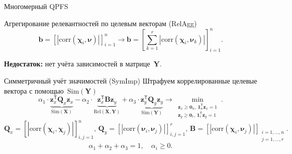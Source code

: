 \documentclass[9pt]{beamer}
\newcommand{\bz}{\mathbf{z}}
\newcommand{\bb}{\mathbf{b}}
\newcommand{\bY}{\mathbf{Y}}
\newcommand{\bX}{\mathbf{X}}
\newcommand{\bB}{\mathbf{B}}
\newcommand{\bQ}{\mathbf{Q}}
\newcommand{\bchi}{\boldsymbol{\chi}}
\newcommand{\bnu}{\boldsymbol{\nu}}
\newcommand{\bOne}{\boldsymbol{1}}
\newcommand{\bZero}{\boldsymbol{0}}
\newcommand{\T}{\mathsf{T}}
\begin{document}
\begin{frame}{Многомерный QPFS}
\begin{block}{Агрегирование релевантностей по целевым векторам (RelAgg)}
\[
\bb = \left[\left|\text{corr}(\bchi_i, \bnu)\right|\right]_{i=1}^n \rightarrow \bb = \left[\sum_{k=1}^r\left|\text{corr}(\bchi_i, \bnu_k)\right|\right]_{i=1}^n.
\]
\end{block}
{\bf Недостаток:} нет учёта зависимостей в матрице~$\bY$. 

\begin{block}{Симметричный учёт значимостей (SymImp)}
Штрафуем коррелированные целевые вектора с помощью~$\text{Sim} (\bY)$
\[
\alpha_1 \cdot \underbrace{\bz_x^{\T} \bQ_x \bz_x}_{\text{Sim}(\bX)} - \alpha_2 \cdot \underbrace{\bz_x^{\T} \bB \bz_y}_{\text{Rel}(\bX, \bY)} + \alpha_3 \cdot \underbrace{\bz_y^{\T} \bQ_y \bz_y}_{\text{Sim}(\bY)} \rightarrow \min_{\substack{\bz_x \geq \bZero_n, \, \bOne_n^{\T}\bz_x=1 \\ \bz_y \geq \bZero_r, \, \bOne_r^{\T}\bz_y=1}}.
\]
\[
\bQ_x = \left[ \left| \text{corr}(\bchi_i, \bchi_j) \right| \right]_{i,j=1}^n, \,
\bQ_y = \left[ \left| \text{corr}(\bnu_i, \bnu_j) \right| \right]_{i,j=1}^r, \,
\bB =  \left[ \left| \text{corr}(\bchi_i, \bnu_j) \right| \right]_{\substack{i=1, \dots, n \\ j=1, \dots, r}}.
\]
\[
\alpha_1 + \alpha_2 + \alpha_3 = 1, \quad \alpha_i \geq 0.
\] 
\end{block}
\end{frame}
\end{document}
